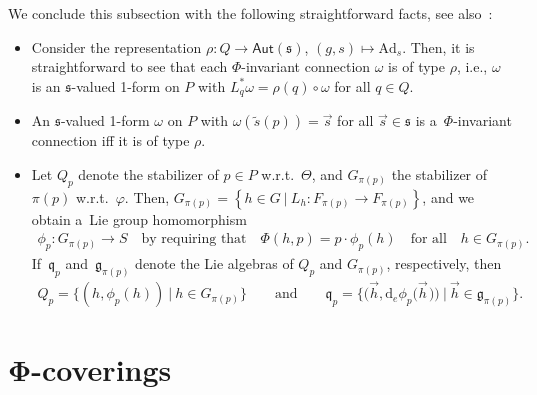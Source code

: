 \documentclass[11pt]{article}
\numberwithin{equation}{section}
\newcommand{\wt}[1]{\widetilde{#1}}
\newcommand{\Add}[1]{\mathrm{Ad}_{#1}}
\begin{document}
We conclude this subsection with the following straightforward facts, see also~\cite{Wang}:
\begin{itemize}\itemsep=0pt
\item
Consider the representation $\rho\colon Q \rightarrow \mathsf{Aut}(\mathfrak{s})$, $(g,s)\mapsto \Add{s}$.
Then, it is straightforward to see that each $\Phi$-invariant connection $\omega$ is of type $\rho$, i.e., $\omega$ is an
$\mathfrak{s}$-valued 1-form on $P$ with $L_{q}^{*}\omega=\rho(q)\circ \omega$ for all $q\in Q$.
\item
An $\mathfrak{s}$-valued 1-form $\omega$ on $P$ with $\omega(\wt{s}(p))=\vec{s}$ for all $\vec{s}\in
\mathfrak{s}$ is a~$\Phi$-invariant connection if\/f it is of type $\rho$.
\item
Let $Q_{p}$ denote the stabilizer of $p\in P$ w.r.t.~$\Theta$, and $G_{\pi(p)}$ the stabilizer of
$\pi(p)$ w.r.t.~$\varphi$.
Then, $G_{\pi(p)}=\left\{h\in G\: | \:L_h\colon F_{\pi(p)}\rightarrow F_{\pi(p)} \right\}$, and we obtain a~Lie group homomorphism
\begin{gather*}
 \phi_p\colon G_{\pi(p)}\rightarrow S\quad\text{by requiring that}\quad \Phi(h,p)=p\cdot\phi_p(h)\quad\text{for all}\quad h\in
G_{\pi(p)}.
\end{gather*}
If~$\mathfrak{q}_p$ and~$\mathfrak{g}_{\pi(p)}$ denote the Lie algebras of $Q_p$ and $G_{\pi(p)}$, respectively, then
\begin{gather}
\label{eq:staoQ}
Q_p=\{(h,\phi_p(h))\:|\:h\in G_{\pi(p)}\}
\qquad
\text{and}
\qquad
\mathfrak{q}_p=\big\{\big(\vec{h},
\mathrm{d}_e\phi_p\big(\vec{h}\hspace{1pt}\big)\big)\:\big|\:\vec{h}\in
\mathfrak{g}_{\pi(p)}\big\}.
\end{gather}
\end{itemize}


\section[$\Phi$-coverings]{$\boldsymbol{\Phi}$-coverings}\label{sec:phiCoverings}
\end{document}
